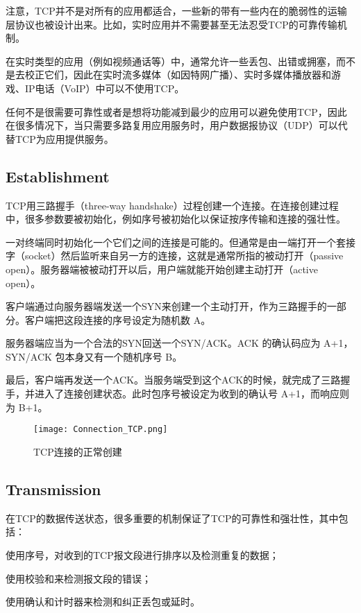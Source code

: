 注意，TCP并不是对所有的应用都适合，一些新的带有一些内在的脆弱性的运输层协议也被设计出来。比如，实时应用并不需要甚至无法忍受TCP的可靠传输机制。

在实时类型的应用（例如视频通话等）中，通常允许一些丢包、出错或拥塞，而不是去校正它们，因此在实时流多媒体（如因特网广播）、实时多媒体播放器和游戏、IP电话（VoIP）中可以不使用TCP。

任何不是很需要可靠性或者是想将功能减到最少的应用可以避免使用TCP，因此在很多情况下，当只需要多路复用应用服务时，用户数据报协议（UDP）可以代替TCP为应用提供服务。


\subsection{Establishment}


TCP用三路握手（three-way handshake）过程创建一个连接。在连接创建过程中，很多参数要被初始化，例如序号被初始化以保证按序传输和连接的强壮性。

一对终端同时初始化一个它们之间的连接是可能的。但通常是由一端打开一个套接字（socket）然后监听来自另一方的连接，这就是通常所指的被动打开（passive open）。服务器端被被动打开以后，用户端就能开始创建主动打开（active open）。

\begin{compactenum}
\item 客户端通过向服务器端发送一个SYN来创建一个主动打开，作为三路握手的一部分。客户端把这段连接的序号设定为随机数 A。
\item 服务器端应当为一个合法的SYN回送一个SYN/ACK。ACK 的确认码应为 A+1，SYN/ACK 包本身又有一个随机序号 B。
\item 最后，客户端再发送一个ACK。当服务端受到这个ACK的时候，就完成了三路握手，并进入了连接创建状态。此时包序号被设定为收到的确认号 A+1，而响应则为 B+1。
\end{compactenum}

\begin{figure}[htbp]
\centering
\texttt{[image: Connection\_TCP.png]}
\caption{TCP连接的正常创建}
\end{figure}



\subsection{Transmission}

在TCP的数据传送状态，很多重要的机制保证了TCP的可靠性和强壮性，其中包括：

\begin{compactitem}
\item 使用序号，对收到的TCP报文段进行排序以及检测重复的数据；
\item 使用校验和来检测报文段的错误；
\item 使用确认和计时器来检测和纠正丢包或延时。
\end{compactitem}

